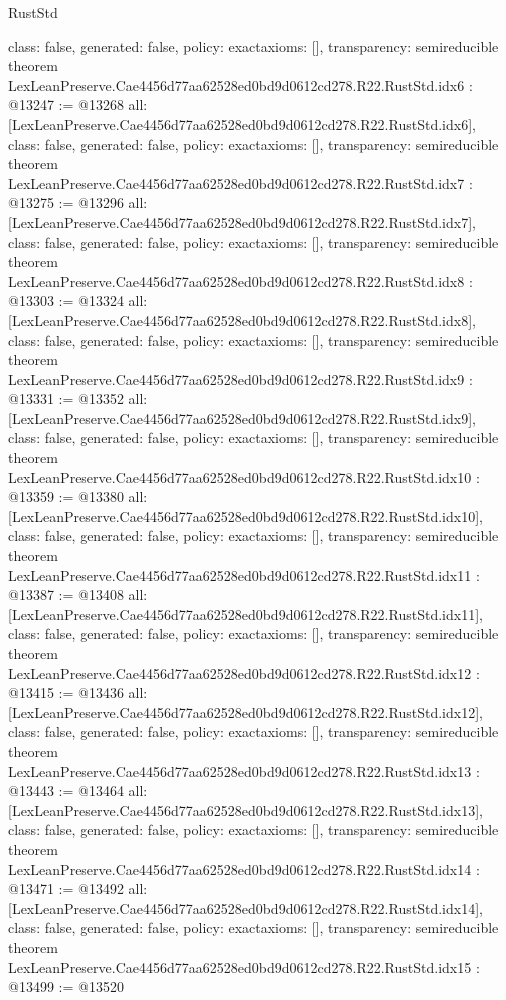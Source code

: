 \begin{lexlean}{RustStd}
\begin{coremodule}
{  class: false,
  generated: false,
  policy: exact{axioms: []},
  transparency: semireducible
}
theorem LexLeanPreserve.Cae4456d77aa62528ed0bd9d0612cd278.R22.RustStd.idx6 : @13247 := @13268 {
  all: [LexLeanPreserve.Cae4456d77aa62528ed0bd9d0612cd278.R22.RustStd.idx6],
  class: false,
  generated: false,
  policy: exact{axioms: []},
  transparency: semireducible
}
theorem LexLeanPreserve.Cae4456d77aa62528ed0bd9d0612cd278.R22.RustStd.idx7 : @13275 := @13296 {
  all: [LexLeanPreserve.Cae4456d77aa62528ed0bd9d0612cd278.R22.RustStd.idx7],
  class: false,
  generated: false,
  policy: exact{axioms: []},
  transparency: semireducible
}
theorem LexLeanPreserve.Cae4456d77aa62528ed0bd9d0612cd278.R22.RustStd.idx8 : @13303 := @13324 {
  all: [LexLeanPreserve.Cae4456d77aa62528ed0bd9d0612cd278.R22.RustStd.idx8],
  class: false,
  generated: false,
  policy: exact{axioms: []},
  transparency: semireducible
}
theorem LexLeanPreserve.Cae4456d77aa62528ed0bd9d0612cd278.R22.RustStd.idx9 : @13331 := @13352 {
  all: [LexLeanPreserve.Cae4456d77aa62528ed0bd9d0612cd278.R22.RustStd.idx9],
  class: false,
  generated: false,
  policy: exact{axioms: []},
  transparency: semireducible
}
theorem LexLeanPreserve.Cae4456d77aa62528ed0bd9d0612cd278.R22.RustStd.idx10 : @13359 := @13380 {
  all: [LexLeanPreserve.Cae4456d77aa62528ed0bd9d0612cd278.R22.RustStd.idx10],
  class: false,
  generated: false,
  policy: exact{axioms: []},
  transparency: semireducible
}
theorem LexLeanPreserve.Cae4456d77aa62528ed0bd9d0612cd278.R22.RustStd.idx11 : @13387 := @13408 {
  all: [LexLeanPreserve.Cae4456d77aa62528ed0bd9d0612cd278.R22.RustStd.idx11],
  class: false,
  generated: false,
  policy: exact{axioms: []},
  transparency: semireducible
}
theorem LexLeanPreserve.Cae4456d77aa62528ed0bd9d0612cd278.R22.RustStd.idx12 : @13415 := @13436 {
  all: [LexLeanPreserve.Cae4456d77aa62528ed0bd9d0612cd278.R22.RustStd.idx12],
  class: false,
  generated: false,
  policy: exact{axioms: []},
  transparency: semireducible
}
theorem LexLeanPreserve.Cae4456d77aa62528ed0bd9d0612cd278.R22.RustStd.idx13 : @13443 := @13464 {
  all: [LexLeanPreserve.Cae4456d77aa62528ed0bd9d0612cd278.R22.RustStd.idx13],
  class: false,
  generated: false,
  policy: exact{axioms: []},
  transparency: semireducible
}
theorem LexLeanPreserve.Cae4456d77aa62528ed0bd9d0612cd278.R22.RustStd.idx14 : @13471 := @13492 {
  all: [LexLeanPreserve.Cae4456d77aa62528ed0bd9d0612cd278.R22.RustStd.idx14],
  class: false,
  generated: false,
  policy: exact{axioms: []},
  transparency: semireducible
}
theorem LexLeanPreserve.Cae4456d77aa62528ed0bd9d0612cd278.R22.RustStd.idx15 : @13499 := @13520 {
}
\end{coremodule}
\end{lexlean}

